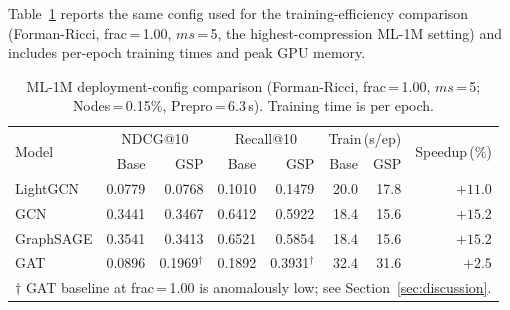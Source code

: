 \begin{table}[ht]
\centering
\caption{ML-1M best-sweep summary (frac\,=\,1.00). Per-model best curvature mode and $ms$ selected by highest GSP NDCG@10. All models evaluated on the full ML-1M test split.}
\label{tab:ml1m_summary}
\end{table}

Table~\ref{tab:ml1m_detailed} reports the same config used for the training-efficiency comparison (Forman-Ricci, frac\,=\,1.00, $ms$\,=\,5, the highest-compression ML-1M setting) and includes per-epoch training times and peak GPU memory.

\begin{table}[ht]
\centering
\caption{ML-1M deployment-config comparison (Forman-Ricci, frac\,=\,1.00, $ms$\,=\,5; Nodes\,=\,0.15\%, Prepro\,=\,6.3\,s). Training time is per epoch.}
\label{tab:ml1m_detailed}
\setlength{\tabcolsep}{5pt}
\begin{tabular}{l r r r r r r r}
\toprule
\multirow{2}{*}{Model} &
  \multicolumn{2}{c}{NDCG@10} & \multicolumn{2}{c}{Recall@10} &
  \multicolumn{2}{c}{Train\,(s/ep)} & \multirow{2}{*}{Speedup\,(\%)} \\
\cmidrule(lr){2-3}\cmidrule(lr){4-5}\cmidrule(lr){6-7}
 & Base & GSP & Base & GSP & Base & GSP & \\
\midrule
LightGCN  & 0.0779 & 0.0768 & 0.1010 & 0.1479 & 20.0 & 17.8 & $+11.0$ \\
GCN       & 0.3441 & 0.3467 & 0.6412 & 0.5922 & 18.4 & 15.6 & $+15.2$ \\
GraphSAGE & 0.3541 & 0.3413 & 0.6521 & 0.5854 & 18.4 & 15.6 & $+15.2$ \\
GAT       & 0.0896 & 0.1969$^\dagger$ & 0.1892 & 0.3931$^\dagger$ & 32.4 & 31.6 & $+2.5$ \\
\bottomrule
\multicolumn{8}{l}{\footnotesize $\dagger$ GAT baseline at frac\,=\,1.00 is anomalously low; see Section~\ref{sec:discussion}.}
\end{tabular}
\end{table}

